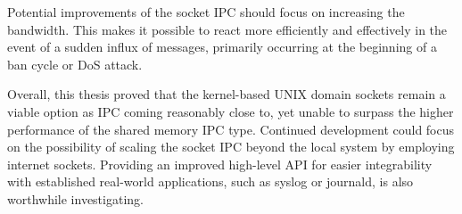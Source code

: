 Potential improvements of the socket \ac{IPC} should focus on increasing the bandwidth.
This makes it possible to react more efficiently and effectively in the event of a sudden influx of messages, primarily occurring at the beginning of a ban cycle or \ac{DoS} attack.

Overall, this thesis proved that the kernel-based UNIX domain sockets remain a viable option as \ac{IPC} coming reasonably close to, yet unable to surpass the higher performance of the shared memory \ac{IPC} type.
Continued development could focus on the possibility of scaling the socket \ac{IPC} beyond the local system by employing internet sockets.
Providing an improved high-level \ac{API} for easier integrability with established real-world applications, such as syslog or journald, is also worthwhile investigating.